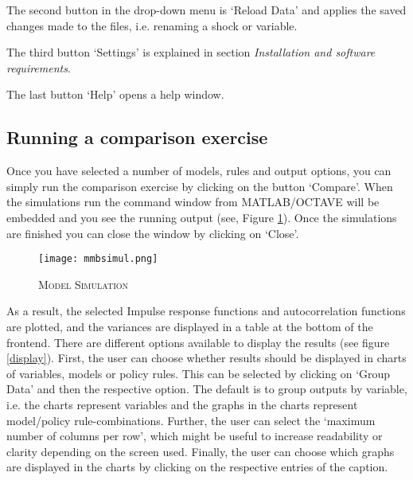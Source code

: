 The second button in the drop-down menu is `Reload Data' and applies the saved changes made to the files, i.e. renaming a shock or variable.

The third button `Settings' is explained in section \textit{Installation and software requirements}.

The last button `Help' opens a help window. 


\subsection*{Running a comparison exercise}
Once you have selected a number of models, rules and output options, you can simply run the comparison exercise by clicking on the button `Compare'. When the simulations run the command window from MATLAB/OCTAVE will be embedded and you see the running output (see, Figure \ref{mmbsimul}). Once the simulations are finished you can close the window by clicking on `Close'.
 
\begin{figure}[H]
	\centering
	\caption{\textsc{Model Simulation}}
	\vspace{0.2cm}
	\texttt{[image: mmbsimul.png]}\\
	\label{mmbsimul}
\end{figure}

As a result, the selected Impulse response functions and  autocorrelation functions are plotted, and the variances are displayed in a table at the bottom of the frontend. 
There are different options available to display the results (see figure \ref{display}). First, the user can choose whether results should be displayed in charts of variables, models or policy rules. This can be selected by clicking on `Group Data' and then the respective option. The default is to group outputs by variable, i.e. the charts represent variables and the graphs in the charts represent model/policy rule-combinations. 
Further, the user can select the `maximum number of columns per row', which might be useful to increase readability or clarity depending on the screen used. 
Finally, the user can choose which graphs are displayed in the charts by clicking on the respective entries of the caption.

